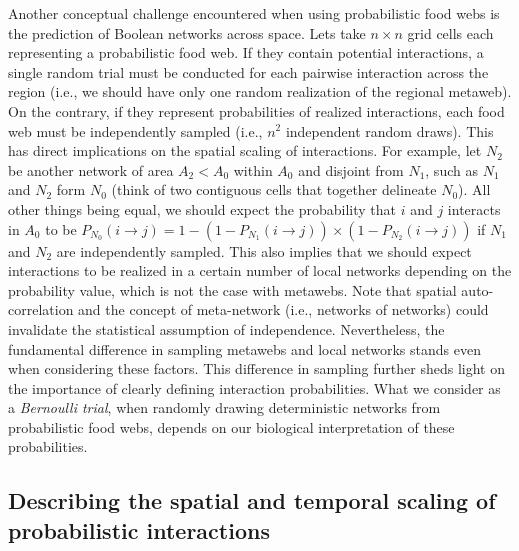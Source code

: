 \documentclass[11pt]{article}
\begin{document}
Another conceptual challenge encountered when using probabilistic food
webs is the prediction of Boolean networks across space. Lets take
\(n \times n\) grid cells each representing a probabilistic food web. If
they contain potential interactions, a single random trial must be
conducted for each pairwise interaction across the region (i.e., we
should have only one random realization of the regional metaweb). On the
contrary, if they represent probabilities of realized interactions, each
food web must be independently sampled (i.e., \(n^2\) independent random
draws). This has direct implications on the spatial scaling of
interactions. For example, let \(N_2\) be another network of area
\(A_2 < A_0\) within \(A_0\) and disjoint from \(N_1\), such as \(N_1\)
and \(N_2\) form \(N_0\) (think of two contiguous cells that together
delineate \(N_0\)). All other things being equal, we should expect the
probability that \(i\) and \(j\) interacts in \(A_0\) to be
\(P_{N_0}(i \rightarrow j) = 1 - (1 - P_{N_1}(i \rightarrow j)) \times (1 - P_{N_2}(i \rightarrow j))\)
if \(N_1\) and \(N_2\) are independently sampled. This also implies that
we should expect interactions to be realized in a certain number of
local networks depending on the probability value, which is not the case
with metawebs. Note that spatial auto-correlation and the concept of
meta-network (i.e., networks of networks) could invalidate the
statistical assumption of independence. Nevertheless, the fundamental
difference in sampling metawebs and local networks stands even when
considering these factors. This difference in sampling further sheds
light on the importance of clearly defining interaction probabilities.
What we consider as a \emph{Bernoulli trial}, when randomly drawing
deterministic networks from probabilistic food webs, depends on our
biological interpretation of these probabilities.

\hypertarget{describing-the-spatial-and-temporal-scaling-of-probabilistic-interactions}{%
\subsection{Describing the spatial and temporal scaling of probabilistic
interactions}\label{describing-the-spatial-and-temporal-scaling-of-probabilistic-interactions}}
\end{document}

